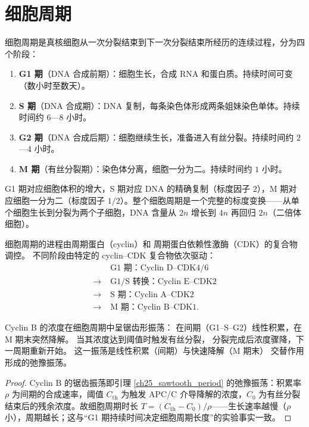 \section{细胞周期}

\begin{definition}[细胞周期]\label{def:cell_cycle}
细胞周期是真核细胞从一次分裂结束到下一次分裂结束所经历的连续过程，分为四个阶段：
\begin{enumerate}[label=(\roman*)]
    \item \textbf{G1 期}（DNA 合成前期）：细胞生长，合成 RNA 和蛋白质。持续时间可变（数小时至数天）。
    \item \textbf{S 期}（DNA 合成期）：DNA 复制，每条染色体形成两条姐妹染色单体。持续时间约 $6$—$8$ 小时。
    \item \textbf{G2 期}（DNA 合成后期）：细胞继续生长，准备进入有丝分裂。持续时间约 $2$—$4$ 小时。
    \item \textbf{M 期}（有丝分裂期）：染色体分离，细胞一分为二。持续时间约 $1$ 小时。
\end{enumerate}
G1 期对应细胞体积的增大，S 期对应 DNA 的精确复制（标度因子 $2$），M 期对应细胞一分为二（标度因子 $1/2$）。整个细胞周期是一个完整的标度变换——从单个细胞生长到分裂为两个子细胞，DNA 含量从 $2n$ 增长到 $4n$ 再回归 $2n$（二倍体细胞）。
\end{definition}

\begin{proposition}
\label{prop:cyclin_cdk_oscillation}
细胞周期的进程由周期蛋白（cyclin）和
周期蛋白依赖性激酶（CDK）的复合物调控。
不同阶段由特定的 cyclin--CDK 复合物依次驱动：
\[
\begin{aligned}
&\text{G1 期：Cyclin D--CDK4/6} \\
\longrightarrow\;&\text{G1/S 转换：Cyclin E--CDK2} \\
\longrightarrow\;&\text{S 期：Cyclin A--CDK2} \\
\longrightarrow\;&\text{M 期：Cyclin B--CDK1}.
\end{aligned}
\]

Cyclin B 的浓度在细胞周期中呈锯齿形振荡：
在间期（G1--S--G2）线性积累，在 M 期末突然降解。
当其浓度达到阈值时触发有丝分裂，
分裂完成后浓度骤降，下一周期重新开始。
这一振荡是线性积累（间期）与快速降解（M 期末）
交替作用形成的弛豫振荡。
\end{proposition}

\begin{proof}
Cyclin B 的锯齿振荡即引理 \ref{ch25_sawtooth_period} 的弛豫振荡：积累率 $\rho$ 为间期的合成速率，阈值 $C_{\text{th}}$ 为触发 APC/C 介导降解的浓度，$C_0$ 为有丝分裂结束后的残余浓度。故细胞周期时长 $T = (C_{\text{th}} - C_0)/\rho$——生长速率越慢（$\rho$ 小），周期越长；这与“G1 期持续时间决定细胞周期长度”的实验事实一致。
\end{proof}

